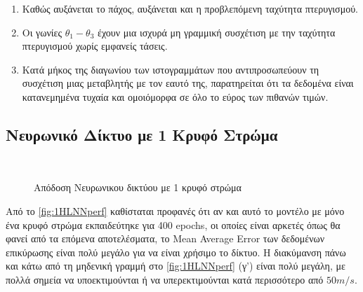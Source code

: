 \begin{enumerate}
\def\labelenumi{\arabic{enumi}.}
\item
  Καθώς αυξάνεται το πάχος, αυξάνεται και η προβλεπόμενη ταχύτητα πτερυγισμού.
\item
  Οι γωνίες \(\theta_{1} - \theta_{3}\) έχουν μια ισχυρά μη γραμμική συσχέτιση με την ταχύτητα πτερυγισμού χωρίς εμφανείς τάσεις.
\item
  Κατά μήκος της διαγωνίου των ιστογραμμάτων που αντιπροσωπεύουν τη συσχέτιση μιας μεταβλητής με τον εαυτό της, παρατηρείται ότι τα δεδομένα είναι κατανεμημένα τυχαία και ομοιόμορφα σε όλο το εύρος των πιθανών τιμών.
\end{enumerate}

\subsection{Νευρωνικό Δίκτυο με 1 Κρυφό Στρώμα}\label{hidden-layer-neural-network}


\begin{figure}[H]
  \centering
   \\

  \caption{Απόδοση Νευρωνικου δικτύου με 1 κρυφό στρώμα}
  \label{fig:1HLNNperf}
\end{figure}

Από το \autoref{fig:1HLNNperf} καθίσταται προφανές ότι αν και αυτό το μοντέλο με μόνο ένα κρυφό στρώμα εκπαιδεύτηκε για 400 \textlatin{epochs}, οι οποίες είναι αρκετές όπως θα φανεί από τα επόμενα αποτελέσματα, το \textlatin{Mean Average Error} των δεδομένων επικύρωσης είναι πολύ μεγάλο για να είναι χρήσιμο το δίκτυο. Η διακύμανση πάνω και κάτω από τη μηδενική γραμμή στο \autoref{fig:1HLNNperf} (γ') είναι πολύ μεγάλη, με πολλά σημεία να υποεκτιμούνται ή να υπερεκτιμούνται κατά περισσότερο από $50 m/s$.


